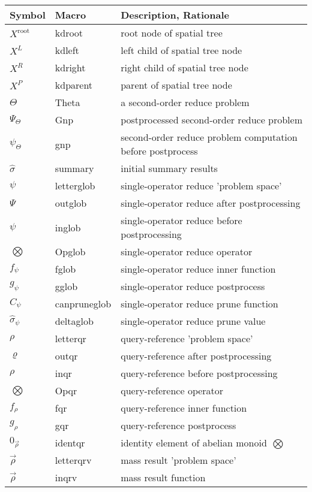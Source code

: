 \documentclass[times, leqno,twocolumn]{article}
\newcommand{\summary}{\hat{\sigma}}
\newcommand{\Gnp}{\Psi_{\Theta}}
\newcommand{\gnp}{\psi_{\Theta}}
\newcommand{\kdroot}[1]{#1^{\text{root}}}
\newcommand{\kdleft}[1]{#1^{\!L}}
\newcommand{\kdright}[1]{#1^{\!R}}
\newcommand{\kdparent}[1]{#1^{\!P}}
\newcommand{\nameOp}[2]{\mathop{#1\nolimits\!\!_{#2}}}
\newcommand{\myOp}[1]{\nameOp{\bigotimes}{#1}}
\newcommand{\letterglob}{\psi}
\newcommand{\outglob}{\Psi}
\newcommand{\inglob}{\psi}
\newcommand{\Opglob}{\myOp{\letterglob}}
\newcommand{\fglob}{f_{\!\letterglob}}
\newcommand{\gglob}{g_{\!\letterglob}}
\newcommand{\canpruneglob}{C_{\!\letterglob}}
\newcommand{\deltaglob}{\summary_{\!\letterglob}}
\newcommand{\letterqr}{\rho}
\newcommand{\outqr}{\varrho}
\newcommand{\inqr}{\rho}
\newcommand{\Opqr}{\myOp{\letterqr}}
\newcommand{\fqr}{f_{\!\letterqr}}
\newcommand{\gqr}{g_{\!\letterqr}}
\newcommand{\letterqrv}{\vec{\rho}}
\newcommand{\inqrv}{\vec{\rho}}
\newcommand{\identqr}{0_{\!\letterqrv}}
\begin{document}
\begin{appendix}
\begin{table*}
\begin{tabular}{|l|l|l|}
\hline
Symbol & Macro & Description, Rationale
\\ \hline $\kdroot{X}$ & kdroot & root node of spatial tree
\\ $\kdleft{X}$ & kdleft & left child of spatial tree node
\\ $\kdright{X}$ & kdright & right child of spatial tree node
\\ $\kdparent{X}$ & kdparent & parent of spatial tree node
\\ \hline $\Theta$ & Theta & a second-order reduce problem
\\ $\Gnp$ & Gnp & postprocessed second-order reduce problem
\\ $\gnp$ & gnp & second-order reduce problem computation before postprocess
\\ $\summary$ & summary & initial summary results
\\ \hline $\letterglob$ & letterglob & single-operator reduce 'problem space'
\\ $\outglob$ & outglob & single-operator reduce after postprocessing
\\ $\inglob$ & inglob & single-operator reduce before postprocessing
\\ $\Opglob$ & Opglob & single-operator reduce operator
\\ $\fglob$ & fglob & single-operator reduce inner function
\\ $\gglob$ & gglob & single-operator reduce postprocess
\\ $\canpruneglob$ & canpruneglob & single-operator reduce prune function
\\ $\deltaglob$ & deltaglob & single-operator reduce prune value
\\ \hline $\letterqr$ & letterqr & query-reference 'problem space'
\\ $\outqr$ & outqr & query-reference after postprocessing
\\ $\inqr$ & inqr & query-reference before postprocessing
\\ $\Opqr$ & Opqr & query-reference operator
\\ $\fqr$ & fqr & query-reference inner function
\\ $\gqr$ & gqr & query-reference postprocess
\\ $\identqr$ & identqr & identity element of abelian monoid $\Opqr$
\\ $\letterqrv$ & letterqrv & mass result 'problem space'
\\ $\inqrv$ & inqrv & mass result function

\end{tabular}
\end{table*}
\end{appendix}
\end{document}

